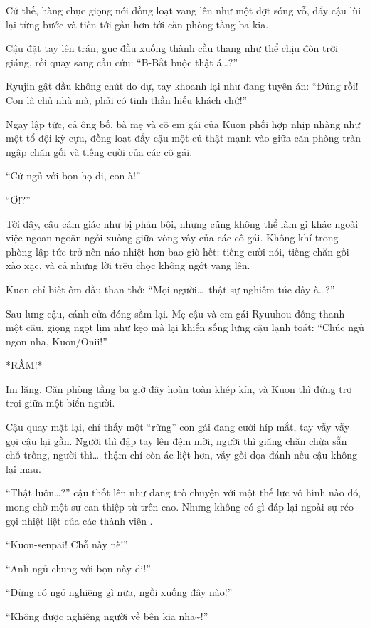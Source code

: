 \documentclass[../main.tex]{subfiles}
\begin{document}
Cứ thế, hàng chục giọng nói đồng loạt vang lên như một đợt sóng vỗ, đẩy cậu lùi lại từng bước và tiến tới gần hơn tới căn phòng tầng ba kia.

Cậu đặt tay lên trán, gục đầu xuống thành cầu thang như thể chịu đòn trời giáng, rồi quay sang cầu cứu: ``B-Bắt buộc thật á\dots?''

Ryujin gật đầu không chút do dự, tay khoanh lại như đang tuyên án: ``Đúng rồi! Con là chủ nhà mà, phải có tinh thần hiếu khách chứ!''

Ngay lập tức, cả ông bố, bà mẹ và cô em gái của Kuon phối hợp nhịp nhàng như một tổ đội kỳ cựu, đồng loạt đẩy cậu một cú thật mạnh vào giữa căn phòng tràn ngập chăn gối và tiếng cười của các cô gái.

``Cứ ngủ với bọn họ đi, con à!''

``Ơ!?''

Tới đây, cậu cảm giác như bị phản bội, nhưng cũng không thể làm gì khác ngoài việc ngoan ngoãn ngồi xuống giữa vòng vây của các cô gái. Không khí trong phòng lập tức trở nên náo nhiệt hơn bao giờ hết: tiếng cười nói, tiếng chăn gối xào xạc, và cả những lời trêu chọc không ngớt vang lên.

Kuon chỉ biết ôm đầu than thở: ``Mọi người\dots\ thật sự nghiêm túc đấy à\dots?''

Sau lưng cậu, cánh cửa đóng sầm lại. Mẹ cậu và em gái Ryuuhou đồng thanh một câu, giọng ngọt lịm như kẹo mà lại khiến sống lưng cậu lạnh toát: ``Chúc ngủ ngon nha, Kuon/Onii!''

*RẦM!*

Im lặng. Căn phòng tầng ba giờ đây hoàn toàn khép kín, và Kuon thì đứng trơ trọi giữa một biển người.

Cậu quay mặt lại, chỉ thấy một ``rừng'' con gái đang cười híp mắt, tay vẫy vẫy gọi cậu lại gần. Người thì đập tay lên đệm mời, người thì giăng chăn chừa sẵn chỗ trống, người thì\dots\ thậm chí còn ác liệt hơn, vẫy gối dọa đánh nếu cậu không lại mau.

``Thật luôn\dots?'' cậu thốt lên như đang trò chuyện với một thế lực vô hình nào đó, mong chờ một sự can thiệp từ trên cao. Nhưng không có gì đáp lại ngoài sự réo gọi nhiệt liệt của các thành viên \hll.

``Kuon-senpai! Chỗ này nè!''

``Anh ngủ chung với bọn này đi!''

``Đừng có ngó nghiêng gì nữa, ngồi xuống đây nào!''

``Không được nghiêng người về bên kia nha\~{}!''
\end{document}
